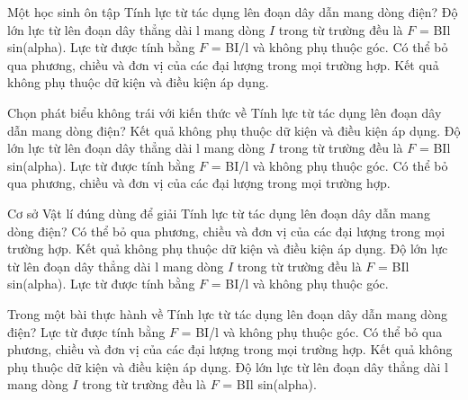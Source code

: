 \begin{ex}
Một học sinh ôn tập Tính lực từ tác dụng lên đoạn dây dẫn mang dòng điện?
\choice
{\True Độ lớn lực từ lên đoạn dây thẳng dài l mang dòng $I$ trong từ trường đều là $F$ = BIl sin(alpha).}
{Lực từ được tính bằng $F$ = BI/l và không phụ thuộc góc.}
{Có thể bỏ qua phương, chiều và đơn vị của các đại lượng trong mọi trường hợp.}
{Kết quả không phụ thuộc dữ kiện và điều kiện áp dụng.}
\end{ex}

\begin{ex}
Chọn phát biểu không trái với kiến thức về Tính lực từ tác dụng lên đoạn dây dẫn mang dòng điện?
\choice
{Kết quả không phụ thuộc dữ kiện và điều kiện áp dụng.}
{\True Độ lớn lực từ lên đoạn dây thẳng dài l mang dòng $I$ trong từ trường đều là $F$ = BIl sin(alpha).}
{Lực từ được tính bằng $F$ = BI/l và không phụ thuộc góc.}
{Có thể bỏ qua phương, chiều và đơn vị của các đại lượng trong mọi trường hợp.}
\end{ex}

\begin{ex}
Cơ sở Vật lí đúng dùng để giải Tính lực từ tác dụng lên đoạn dây dẫn mang dòng điện?
\choice
{Có thể bỏ qua phương, chiều và đơn vị của các đại lượng trong mọi trường hợp.}
{Kết quả không phụ thuộc dữ kiện và điều kiện áp dụng.}
{\True Độ lớn lực từ lên đoạn dây thẳng dài l mang dòng $I$ trong từ trường đều là $F$ = BIl sin(alpha).}
{Lực từ được tính bằng $F$ = BI/l và không phụ thuộc góc.}
\end{ex}

\begin{ex}
Trong một bài thực hành về Tính lực từ tác dụng lên đoạn dây dẫn mang dòng điện?
\choice
{Lực từ được tính bằng $F$ = BI/l và không phụ thuộc góc.}
{Có thể bỏ qua phương, chiều và đơn vị của các đại lượng trong mọi trường hợp.}
{Kết quả không phụ thuộc dữ kiện và điều kiện áp dụng.}
{\True Độ lớn lực từ lên đoạn dây thẳng dài l mang dòng $I$ trong từ trường đều là $F$ = BIl sin(alpha).}
\end{ex}

